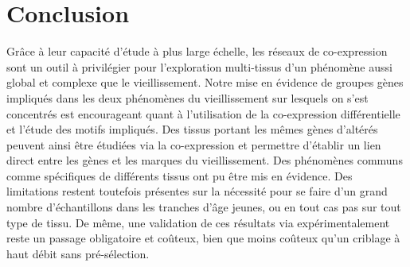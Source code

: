 \section{Conclusion}

Grâce à leur capacité d'étude à plus large échelle, les réseaux de co-expression sont un outil à privilégier pour l'exploration multi-tissus d'un phénomène aussi global et complexe que le vieillissement. Notre mise en évidence de groupes gènes impliqués dans les deux phénomènes du vieillissement sur lesquels on s'est concentrés est encourageant quant à l'utilisation de la co-expression différentielle et l'étude des motifs impliqués. Des tissus portant les mêmes gènes d'altérés peuvent ainsi être étudiées via la co-expression et permettre d'établir un lien direct entre les gènes et les marques du vieillissement. Des phénomènes communs comme spécifiques de différents tissus ont pu être mis en évidence. Des limitations restent toutefois présentes sur la nécessité pour se faire d'un grand nombre d'échantillons dans les tranches d'âge jeunes, ou en tout cas pas sur tout type de tissu. De même, une validation de ces résultats via expérimentalement reste un passage obligatoire et coûteux, bien que moins coûteux qu'un criblage à haut débit sans pré-sélection.








